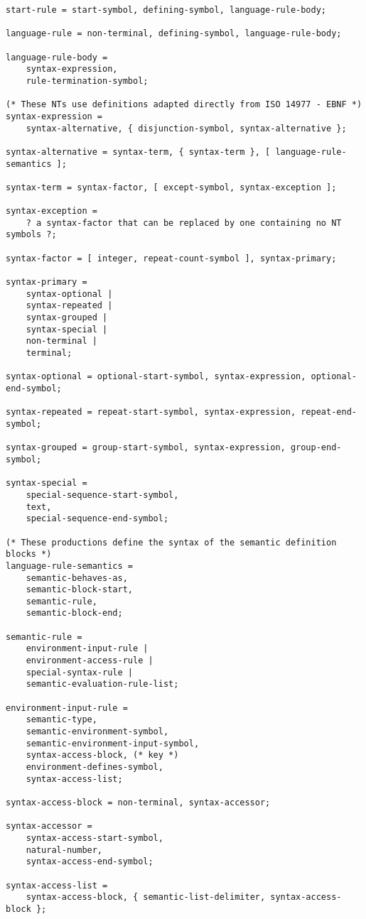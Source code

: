 \begin{lstlisting}
start-rule = start-symbol, defining-symbol, language-rule-body;

language-rule = non-terminal, defining-symbol, language-rule-body;

language-rule-body = 
    syntax-expression,
    rule-termination-symbol;

(* These NTs use definitions adapted directly from ISO 14977 - EBNF *)
syntax-expression = 
    syntax-alternative, { disjunction-symbol, syntax-alternative };

syntax-alternative = syntax-term, { syntax-term }, [ language-rule-semantics ];

syntax-term = syntax-factor, [ except-symbol, syntax-exception ];

syntax-exception = 
    ? a syntax-factor that can be replaced by one containing no NT symbols ?;

syntax-factor = [ integer, repeat-count-symbol ], syntax-primary;

syntax-primary = 
    syntax-optional | 
    syntax-repeated |
    syntax-grouped |
    syntax-special |
    non-terminal |
    terminal;

syntax-optional = optional-start-symbol, syntax-expression, optional-end-symbol;

syntax-repeated = repeat-start-symbol, syntax-expression, repeat-end-symbol;

syntax-grouped = group-start-symbol, syntax-expression, group-end-symbol;

syntax-special =
    special-sequence-start-symbol,
    text,
    special-sequence-end-symbol;

(* These productions define the syntax of the semantic definition blocks *)
language-rule-semantics = 
    semantic-behaves-as,
    semantic-block-start,
    semantic-rule,
    semantic-block-end;

semantic-rule = 
    environment-input-rule |
    environment-access-rule |
    special-syntax-rule |
    semantic-evaluation-rule-list;

environment-input-rule =
    semantic-type, 
    semantic-environment-symbol,
    semantic-environment-input-symbol,
    syntax-access-block, (* key *)
    environment-defines-symbol,
    syntax-access-list;

syntax-access-block = non-terminal, syntax-accessor;

syntax-accessor = 
    syntax-access-start-symbol,
    natural-number,
    syntax-access-end-symbol;

syntax-access-list = 
    syntax-access-block, { semantic-list-delimiter, syntax-access-block };


\end{lstlisting}
